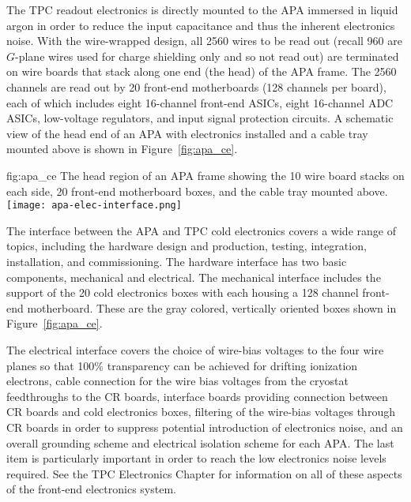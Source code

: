 The TPC readout electronics is directly mounted to the APA immersed in liquid argon in order to reduce the input capacitance and thus the inherent electronics noise.  With the wire-wrapped design, all 2560 wires to be read out (recall 960 are $G$-plane wires used for charge shielding only and so not read out) are terminated on wire boards that stack along one end (the head) of the APA frame.  The 2560 channels are read out by 20 front-end motherboards (128 channels per board), each of which includes eight 16-channel front-end ASICs, eight 16-channel ADC ASICs, low-voltage regulators, and input signal protection circuits.  A schematic view of the head end of an APA with electronics installed and a cable tray mounted above is shown in Figure~\ref{fig:apa_ce}. 

\begin{dunefigure}{fig:apa_ce}
{The head region of an APA frame showing the 10 wire board stacks on each side, 20 front-end motherboard boxes, and the cable tray mounted above.}
\texttt{[image: apa-elec-interface.png]}
\end{dunefigure}

The interface between the APA and TPC cold electronics covers a wide range of topics, including the hardware design and production, testing, integration, installation, and commissioning. The hardware interface has two basic components, mechanical and electrical. The mechanical interface includes the support of the 20 cold electronics boxes with each housing a 128 channel front-end motherboard.  These are the gray colored, vertically oriented boxes shown in Figure~\ref{fig:apa_ce}. 

The electrical interface covers the choice of wire-bias voltages to the four wire planes so that 100\% transparency can be achieved for drifting ionization electrons, cable connection for the wire bias voltages from the cryostat feedthroughs to the CR boards, interface boards providing connection between CR boards and cold electronics boxes, filtering of the wire-bias voltages through CR boards in order to suppress potential introduction of electronics noise, and an overall grounding scheme and electrical isolation scheme for each APA. The last item is particularly important in order to reach the low electronics noise levels required.  See the TPC Electronics Chapter for information on all of these aspects of the front-end electronics system.  


